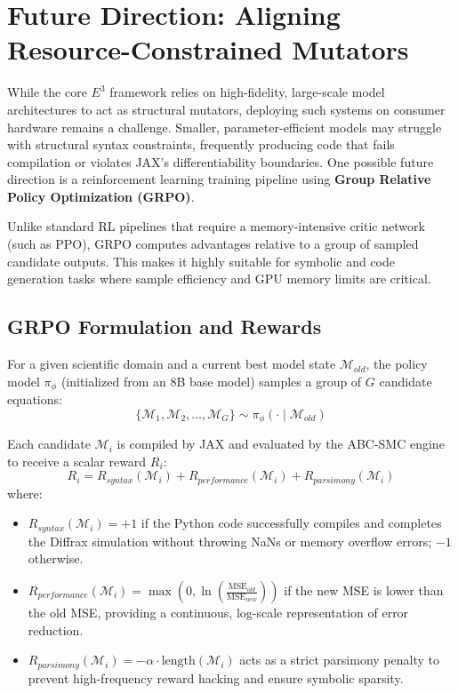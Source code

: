 \section{Future Direction: Aligning Resource-Constrained Mutators}
\label{sec:rl}

While the core $E^3$ framework relies on high-fidelity, large-scale model architectures to act as structural mutators, deploying such systems on consumer hardware remains a challenge. Smaller, parameter-efficient models may struggle with structural syntax constraints, frequently producing code that fails compilation or violates JAX's differentiability boundaries. One possible future direction is a reinforcement learning training pipeline using \textbf{Group Relative Policy Optimization (GRPO)}.

Unlike standard RL pipelines that require a memory-intensive critic network (such as PPO), GRPO computes advantages relative to a group of sampled candidate outputs. This makes it highly suitable for symbolic and code generation tasks where sample efficiency and GPU memory limits are critical.

\subsection{GRPO Formulation and Rewards}
For a given scientific domain and a current best model state $\mathcal{M}_{old}$, the policy model $\pi_\phi$ (initialized from an 8B base model) samples a group of $G$ candidate equations:
\begin{equation}
    \{\mathcal{M}_1, \mathcal{M}_2, \dots, \mathcal{M}_G\} \sim \pi_\phi(\cdot \mid \mathcal{M}_{old})
\end{equation}

Each candidate $\mathcal{M}_i$ is compiled by JAX and evaluated by the ABC-SMC engine to receive a scalar reward $R_i$:
\begin{equation}
    R_i = R_{syntax}(\mathcal{M}_i) + R_{performance}(\mathcal{M}_i) + R_{parsimony}(\mathcal{M}_i)
\end{equation}
where:
\begin{itemize}
    \item $R_{syntax}(\mathcal{M}_i) = +1$ if the Python code successfully compiles and completes the Diffrax simulation without throwing NaNs or memory overflow errors; $-1$ otherwise.
    \item $R_{performance}(\mathcal{M}_i) = \max\left(0, \ln\left(\frac{\text{MSE}_{old}}{\text{MSE}_{new}}\right)\right)$ if the new MSE is lower than the old MSE, providing a continuous, log-scale representation of error reduction.
    \item $R_{parsimony}(\mathcal{M}_i) = -\alpha \cdot \text{length}(\mathcal{M}_i)$ acts as a strict parsimony penalty to prevent high-frequency reward hacking and ensure symbolic sparsity.
\end{itemize}

